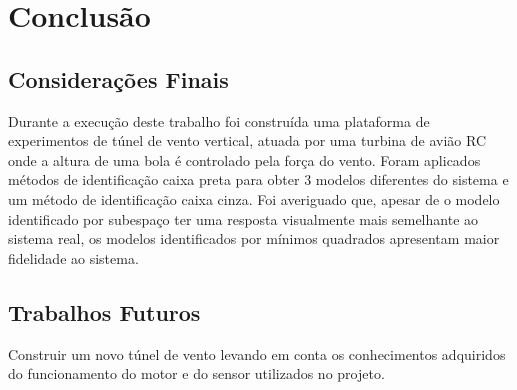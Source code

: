 \chapter{Conclusão} \label{cap7}

\section{Considerações Finais}
Durante a execução deste trabalho foi construída uma plataforma de experimentos de túnel de vento vertical, atuada por uma turbina de avião RC onde a altura de uma bola é controlado pela força do vento. Foram aplicados métodos de identificação caixa preta para obter 3 modelos diferentes do sistema e um método de identificação caixa cinza. Foi averiguado que, apesar de o modelo identificado por subespaço ter uma resposta visualmente mais semelhante ao sistema real, os modelos identificados por mínimos quadrados apresentam maior fidelidade ao sistema.




\section{Trabalhos Futuros}
Construir um novo túnel de vento levando em conta os conhecimentos adquiridos do funcionamento do motor e do sensor utilizados no projeto.


